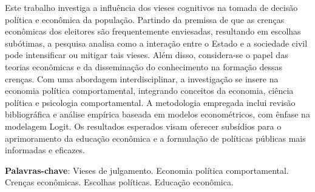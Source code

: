 
\setlength{\absparsep}{18pt} %
\begin{resumo}
    Este trabalho investiga a influência dos vieses cognitivos na tomada de decisão política e econômica da população. Partindo da premissa de que as crenças econômicas dos eleitores são frequentemente enviesadas, resultando em escolhas subótimas, a pesquisa analisa como a interação entre o Estado e a sociedade civil pode intensificar ou mitigar tais vieses. Além disso, considera-se o papel das teorias econômicas e da disseminação do conhecimento na formação dessas crenças. Com uma abordagem interdisciplinar, a investigação se insere na economia política comportamental, integrando conceitos da economia, ciência política e psicologia comportamental. A metodologia empregada inclui revisão bibliográfica e análise empírica baseada em modelos econométricos, com ênfase na modelagem Logit. Os resultados esperados visam oferecer subsídios para o aprimoramento da educação econômica e a formulação de políticas públicas mais informadas e eficazes.

 \textbf{Palavras-chave}: Vieses de julgamento. Economia política comportamental. Crenças econômicas. Escolhas políticas. Educação econômica.
\end{resumo}
